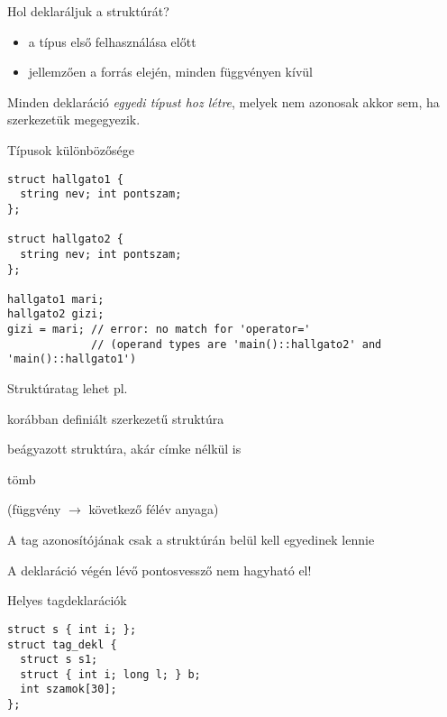 \documentclass[usenames,dvipsnames,aspectratio=169]{beamer}
\begin{document}
\begin{frame}[fragile]
  Hol deklaráljuk a struktúrát?
  \begin{itemize}
    \item a típus első felhasználása előtt
    \item jellemzően a forrás elején, minden függvényen kívül
  \end{itemize}
  Minden deklaráció \emph{egyedi típust hoz létre}, melyek nem azonosak akkor sem, ha szerkezetük megegyezik.
  \begin{exampleblock}{Típusok különbözősége}
    \vspace{-.2cm}
    \begin{verbatim}
struct hallgato1 {
  string nev; int pontszam;
};

struct hallgato2 {
  string nev; int pontszam;
};

hallgato1 mari;
hallgato2 gizi;
gizi = mari; // error: no match for 'operator=' 
             // (operand types are 'main()::hallgato2' and 'main()::hallgato1')
\end{verbatim}
    \vspace{-.2cm}
  \end{exampleblock}
\end{frame}

\begin{frame}[fragile]
  \begin{compactitem}
    \item Struktúratag lehet pl.
    \begin{compactitem}
      \small
      \item korábban definiált szerkezetű struktúra
      \item beágyazott struktúra, akár címke nélkül is
      \item tömb
      \item (függvény $\to$ következő félév anyaga)
    \end{compactitem}
    \item A tag azonosítójának csak a struktúrán belül kell egyedinek lennie
    \item A deklaráció végén lévő pontosvessző nem hagyható el!
  \end{compactitem}
  \small
  \begin{exampleblock}{Helyes tagdeklarációk}
    \vspace{-.2cm}
    \begin{verbatim}
struct s { int i; };
struct tag_dekl {
  struct s s1;
  struct { int i; long l; } b;
  int szamok[30];
};
\end{verbatim}
    \vspace{-.2cm}
  \end{exampleblock}
\end{frame}
\end{document}

